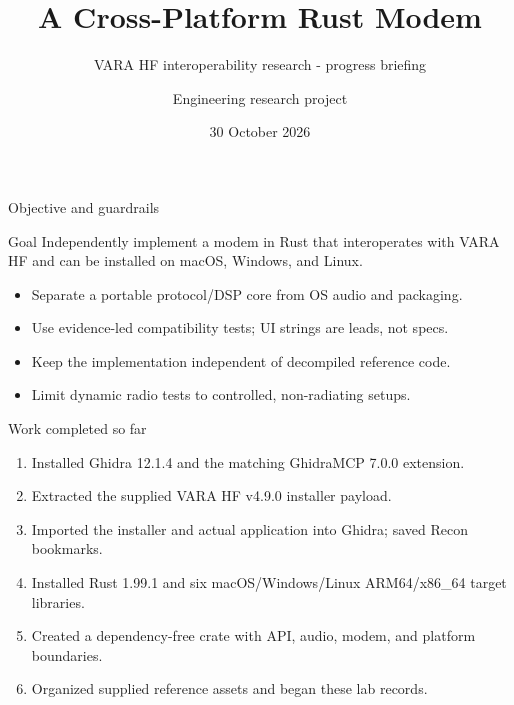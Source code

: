 \documentclass[20pt]{beamer}
\title{A Cross-Platform Rust Modem}
\subtitle{VARA HF interoperability research - progress briefing}
\author{Engineering research project}
\institute{Lab update}
\date{30 October 2026}
\begin{document}
\begin{frame}
  \titlepage
\end{frame}

\begin{frame}{Objective and guardrails}
  \begin{block}{Goal}
    Independently implement a modem in Rust that interoperates with VARA HF
    and can be installed on macOS, Windows, and Linux.
  \end{block}
  \begin{itemize}
    \item Separate a portable protocol/DSP core from OS audio and packaging.
    \item Use evidence-led compatibility tests; UI strings are leads, not specs.
    \item Keep the implementation independent of decompiled reference code.
    \item Limit dynamic radio tests to controlled, non-radiating setups.
  \end{itemize}
\end{frame}

\begin{frame}{Work completed so far}
  \begin{enumerate}
    \item Installed Ghidra 12.1.4 and the matching GhidraMCP 7.0.0 extension.
    \item Extracted the supplied VARA HF v4.9.0 installer payload.
    \item Imported the installer and actual application into Ghidra; saved
          Recon bookmarks.
    \item Installed Rust 1.99.1 and six macOS/Windows/Linux ARM64/x86\_64
          target libraries.
    \item Created a dependency-free crate with API, audio, modem, and platform
          boundaries.
    \item Organized supplied reference assets and began these lab records.
  \end{enumerate}
\end{frame}
\end{document}
